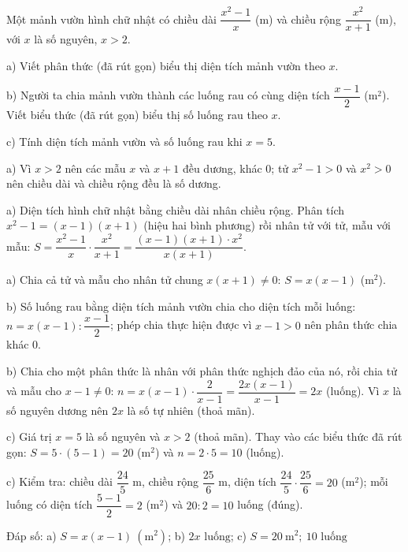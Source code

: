 \begin{problem}[8DS-PS-027]
Một mảnh vườn hình chữ nhật có chiều dài $\dfrac{x^2 - 1}{x}$ (m) và chiều rộng $\dfrac{x^2}{x + 1}$ (m), với $x$ là số nguyên, $x > 2$.

a) Viết phân thức (đã rút gọn) biểu thị diện tích mảnh vườn theo $x$.

b) Người ta chia mảnh vườn thành các luống rau có cùng diện tích $\dfrac{x - 1}{2}$ (m$^2$). Viết biểu thức (đã rút gọn) biểu thị số luống rau theo $x$.

c) Tính diện tích mảnh vườn và số luống rau khi $x = 5$.

\begin{solution}
a) Vì $x > 2$ nên các mẫu $x$ và $x + 1$ đều dương, khác $0$; tử $x^2 - 1 > 0$ và $x^2 > 0$ nên chiều dài và chiều rộng đều là số dương.

a) Diện tích hình chữ nhật bằng chiều dài nhân chiều rộng. Phân tích $x^2 - 1 = (x - 1)(x + 1)$ (hiệu hai bình phương) rồi nhân tử với tử, mẫu với mẫu: $S = \dfrac{x^2 - 1}{x} \cdot \dfrac{x^2}{x + 1} = \dfrac{(x - 1)(x + 1) \cdot x^2}{x(x + 1)}$.

a) Chia cả tử và mẫu cho nhân tử chung $x(x + 1) \neq 0$: $S = x(x - 1)$ (m$^2$).

b) Số luống rau bằng diện tích mảnh vườn chia cho diện tích mỗi luống: $n = x(x - 1) : \dfrac{x - 1}{2}$; phép chia thực hiện được vì $x - 1 > 0$ nên phân thức chia khác $0$.

b) Chia cho một phân thức là nhân với phân thức nghịch đảo của nó, rồi chia tử và mẫu cho $x - 1 \neq 0$: $n = x(x - 1) \cdot \dfrac{2}{x - 1} = \dfrac{2x(x - 1)}{x - 1} = 2x$ (luống). Vì $x$ là số nguyên dương nên $2x$ là số tự nhiên (thoả mãn).

c) Giá trị $x = 5$ là số nguyên và $x > 2$ (thoả mãn). Thay vào các biểu thức đã rút gọn: $S = 5 \cdot (5 - 1) = 20$ (m$^2$) và $n = 2 \cdot 5 = 10$ (luống).

c) Kiểm tra: chiều dài $\dfrac{24}{5}$ m, chiều rộng $\dfrac{25}{6}$ m, diện tích $\dfrac{24}{5} \cdot \dfrac{25}{6} = 20$ (m$^2$); mỗi luống có diện tích $\dfrac{5 - 1}{2} = 2$ (m$^2$) và $20 : 2 = 10$ luống (đúng).

Đáp số: a) $\boxed{S = x(x - 1)\ (\text{m}^2)}$; b) $\boxed{2x \text{ luống}}$; c) $\boxed{S = 20\ \text{m}^2;\ 10 \text{ luống}}$
\end{solution}
\end{problem}

